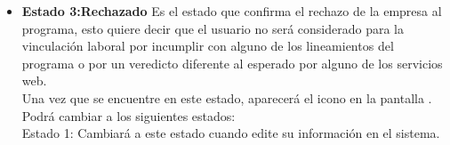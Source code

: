 \begin{itemize}
        
        \item \textbf{Estado 3:Rechazado}
         Es el estado que confirma el rechazo de la empresa al programa, esto quiere decir que el usuario no será considerado para la vinculación laboral por incumplir con alguno de los lineamientos del programa o por un veredicto diferente al esperado por alguno de los servicios web.\\
        Una vez que se encuentre en este estado, aparecerá el icono \faTimesCircle en la pantalla .\\
        Podrá cambiar a los siguientes estados:\\
        Estado 1: Cambiará a este estado cuando edite su información en el sistema.
        

         
    \end{itemize} 
	
